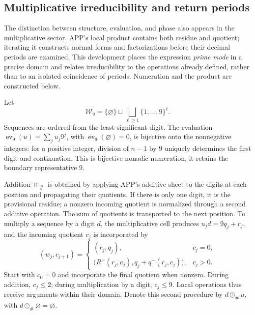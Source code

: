 \subsection{Multiplicative irreducibility and return periods}
\label{primos-retornos}

The distinction between structure, evaluation, and phase also appears in
the multiplicative sector. APP's local product contains both residue and
quotient; iterating it constructs normal forms and factorizations before
their decimal periods are examined. This development places the expression
\emph{prime mode} in a precise domain and relates irreducibility to the
operations already defined, rather than to an isolated coincidence
of periods. Numeration and the product are constructed below.

Let
\[
 \mathcal W_9=\{\varnothing\}\sqcup
 \bigsqcup_{\ell\geq1}\{1,\ldots,9\}^{\ell}.
\]
Sequences are ordered from the least significant digit. The evaluation
\(\operatorname{ev}_9(u)=\sum_j u_j9^j\), with
\(\operatorname{ev}_9(\varnothing)=0\), is bijective onto the nonnegative
integers: for a positive integer, division of \(n-1\) by \(9\)
uniquely determines the first digit and continuation. This is bijective
nonadic numeration; it retains the boundary representative \(9\).

Addition \(\boxplus_\#\) is obtained by applying APP's additive sheet
to the digits at each position and propagating their quotients. If there
is only one digit, it is the provisional residue; a nonzero incoming
quotient is normalized through a second additive operation. The sum of
quotients is transported to the next position. To multiply a sequence by
a digit \(d\), the multiplicative cell produces
\(u_jd=9q_j+r_j\), and the incoming quotient \(c_j\) is incorporated by
\[
 (w_j,c_{j+1})=
 \begin{cases}
 (r_j,q_j),&c_j=0,\\
 \bigl(R^+(r_j,c_j),q_j+q^+(r_j,c_j)\bigr),&c_j>0.
 \end{cases}
\]
Start with \(c_0=0\) and incorporate the final quotient when nonzero.
During addition, \(c_j\leq2\); during multiplication by a digit,
\(c_j\leq9\). Local operations thus receive arguments within
their domain. Denote this second procedure by \(d\odot_\#u\),
with \(d\odot_\#\varnothing=\varnothing\).

